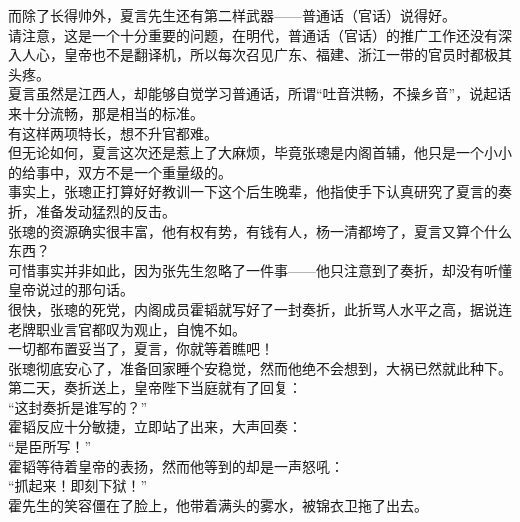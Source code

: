 \begin{multicols}{\theparacolNo}
而除了长得帅外，夏言先生还有第二样武器——普通话（官话）说得好。\\

请注意，这是一个十分重要的问题，在明代，普通话（官话）的推广工作还没有深入人心，皇帝也不是翻译机，所以每次召见广东、福建、浙江一带的官员时都极其头疼。\\

夏言虽然是江西人，却能够自觉学习普通话，所谓“吐音洪畅，不操乡音”，说起话来十分流畅，那是相当的标准。\\

有这样两项特长，想不升官都难。\\

但无论如何，夏言这次还是惹上了大麻烦，毕竟张璁是内阁首辅，他只是一个小小的给事中，双方不是一个重量级的。\\

事实上，张璁正打算好好教训一下这个后生晚辈，他指使手下认真研究了夏言的奏折，准备发动猛烈的反击。\\

张璁的资源确实很丰富，他有权有势，有钱有人，杨一清都垮了，夏言又算个什么东西？\\

可惜事实并非如此，因为张先生忽略了一件事——他只注意到了奏折，却没有听懂皇帝说过的那句话。\\

很快，张璁的死党，内阁成员霍韬就写好了一封奏折，此折骂人水平之高，据说连老牌职业言官都叹为观止，自愧不如。\\

一切都布置妥当了，夏言，你就等着瞧吧！\\

张璁彻底安心了，准备回家睡个安稳觉，然而他绝不会想到，大祸已然就此种下。\\

第二天，奏折送上，皇帝陛下当庭就有了回复：\\

“这封奏折是谁写的？”\\

霍韬反应十分敏捷，立即站了出来，大声回奏：\\

“是臣所写！”\\

霍韬等待着皇帝的表扬，然而他等到的却是一声怒吼：\\

“抓起来！即刻下狱！”\\

霍先生的笑容僵在了脸上，他带着满头的雾水，被锦衣卫拖了出去。\\


\end{multicols}
